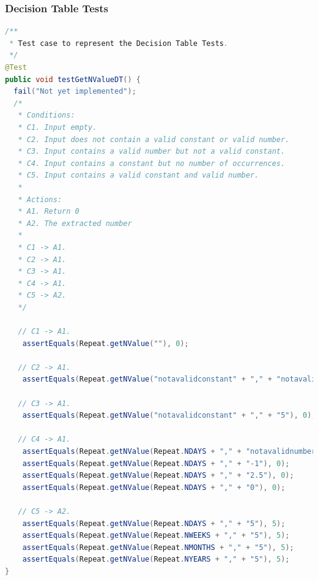 \subsubsection{Decision Table Tests}\label{decision-table-tests}

\begin{lstlisting}[language=Java]
/**
 * Test case to represent the Decision Table Tests.
 */
@Test
public void testGetNValueDT() {
  fail("Not yet implemented");
  /*
   * Conditions:
   * C1. Input empty.
   * C2. Input does not contain a valid constant or valid number.
   * C3. Input contains a valid number but not a valid constant.
   * C4. Input contains a constant but no number of occurrences.
   * C5. Input contains a valid constant and valid number.
   *
   * Actions:
   * A1. Return 0
   * A2. The extracted number
   *
   * C1 -> A1.
   * C2 -> A1.
   * C3 -> A1.
   * C4 -> A1.
   * C5 -> A2.
   */

   // C1 -> A1.
    assertEquals(Repeat.getNValue(""), 0);

   // C2 -> A1.
    assertEquals(Repeat.getNValue("notavalidconstant" + "," + "notavalidnumber"), 0);

   // C3 -> A1.
    assertEquals(Repeat.getNValue("notavalidconstant" + "," + "5"), 0);

   // C4 -> A1.
    assertEquals(Repeat.getNValue(Repeat.NDAYS + "," + "notavalidnumber"), 0);
    assertEquals(Repeat.getNValue(Repeat.NDAYS + "," + "-1"), 0);
    assertEquals(Repeat.getNValue(Repeat.NDAYS + "," + "2.5"), 0);
    assertEquals(Repeat.getNValue(Repeat.NDAYS + "," + "0"), 0);

   // C5 -> A2.
    assertEquals(Repeat.getNValue(Repeat.NDAYS + "," + "5"), 5);
    assertEquals(Repeat.getNValue(Repeat.NWEEKS + "," + "5"), 5);
    assertEquals(Repeat.getNValue(Repeat.NMONTHS + "," + "5"), 5);
    assertEquals(Repeat.getNValue(Repeat.NYEARS + "," + "5"), 5);
}
\end{lstlisting}


